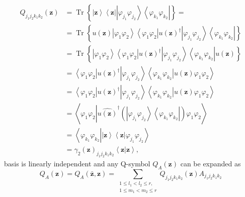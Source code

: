 \documentclass[aps,preprint]{revtex4}%
\begin{document}
\begin{align}
Q_{j_{1}j_{2}k_{1}k_{2}}\left(  \mathbf{z}\right)   &  =\operatorname*{Tr}%
\left\{  \left\vert \mathbf{z}\right\rangle \left\langle \mathbf{z}\right\vert
\left\vert \varphi_{j_{1}}\varphi_{j_{2}}\right\rangle \left\langle
\varphi_{k_{1}}\varphi_{k_{2}}\right\vert \right\}  =\nonumber\\
&  =\operatorname*{Tr}\left\{  u\left(  \mathbf{z}\right)  \left\vert
\varphi_{1}\varphi_{2}\right\rangle \left\langle \varphi_{1}\varphi
_{2}\right\vert u\left(  \mathbf{z}\right)  ^{\dagger}\left\vert
\varphi_{j_{1}}\varphi_{j_{2}}\right\rangle \left\langle \varphi_{k_{1}%
}\varphi_{k_{2}}\right\vert \right\} \\
&  =\operatorname*{Tr}\left\{  \left\vert \varphi_{1}\varphi_{2}\right\rangle
\left\langle \varphi_{1}\varphi_{2}\right\vert u\left(  \mathbf{z}\right)
^{\dagger}\left\vert \varphi_{j_{1}}\varphi_{j_{2}}\right\rangle \left\langle
\varphi_{k_{1}}\varphi_{k_{2}}\right\vert u\left(  \mathbf{z}\right)  \right\}
\\
&  =\left\langle \varphi_{1}\varphi_{2}\right\vert u\left(  \mathbf{z}\right)
^{\dagger}\left\vert \varphi_{j_{1}}\varphi_{j_{2}}\right\rangle \left\langle
\varphi_{k_{1}}\varphi_{k_{2}}\left\vert u\left(  \mathbf{z}\right)
\varphi_{1}\varphi_{2}\right.  \right\rangle \\
&  =\left\langle \varphi_{1}\varphi_{2}\right\vert u\left(  \mathbf{z}\right)
^{\dagger}\left\vert \varphi_{j_{1}}\varphi_{j_{2}}\right\rangle \left\langle
\varphi_{k_{1}}\varphi_{k_{2}}\left\vert u\left(  \mathbf{z}\right)
\varphi_{1}\varphi_{2}\right.  \right\rangle \\
&  =\left\langle \varphi_{1}\varphi_{2}\left\vert \widehat{u\left(
\mathbf{z}\right)  }^{\dagger}\left(  \left\vert \varphi_{j_{1}}\varphi
_{j_{2}}\right\rangle \left\langle \varphi_{k_{1}}\varphi_{k_{2}}\right\vert
\right)  \varphi_{1}\varphi_{2}\right.  \right\rangle \\
&  =\left\langle \varphi_{k_{1}}\varphi_{k_{2}}\left\vert \left\vert
\mathbf{z}\right\rangle \left\langle \mathbf{z}\right\vert \varphi_{j_{1}%
}\varphi_{j_{2}}\right.  \right\rangle \nonumber\\
&  =\gamma_{2}\left(  \mathbf{z}\right)  _{j_{1}j_{2}k_{1}k_{2}}\left\langle
\mathbf{z\left\vert \mathbf{z}\right.  }\right\rangle ,
\end{align}
basis is linearly independent and any Q-symbol $Q_{A}\left(  \mathbf{z}%
\right)  $ can be expanded as
\begin{equation}
Q_{A}\left(  \mathbf{z}\right)  =Q_{A}\left(  \mathbf{\bar{z},z}\right)
=\sum_{\substack{1\leq l_{1}<l_{2}\leq r,\\1\leq m_{1}<m_{2}\leq r}%
}Q_{j_{1}j_{2}k_{1}k_{2}}\left(  \mathbf{z}\right)  A_{j_{1}j_{2}k_{1}k_{2}}%
\end{equation}
\end{document}
